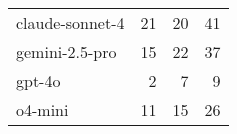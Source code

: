 \begin{tabular}{lrrr}
\toprule
\midrule
claude-sonnet-4 & 21 & 20 & 41 \\
gemini-2.5-pro & 15 & 22 & 37 \\
gpt-4o & 2 & 7 & 9 \\
o4-mini & 11 & 15 & 26 \\
\bottomrule
\end{tabular}
